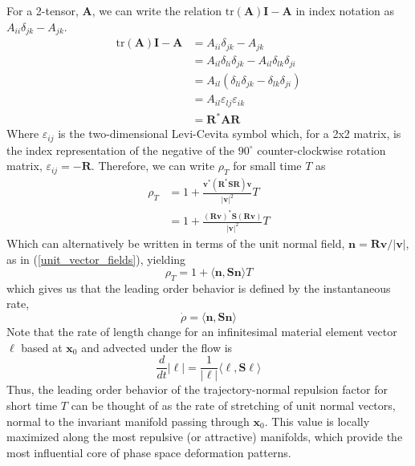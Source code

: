 \documentclass[onecolumn,3p]{elsarticle}
\begin{document}
	For a 2-tensor, \(\mathbf{A}\), we can write the relation \(\text{tr}(\mathbf{A})\mathbf{I}-\mathbf{A}\) in index notation as \(A_{ii}\delta_{jk} - A_{jk}\).
	\begin{equation}
	\begin{aligned}
	\text{tr}(\mathbf{A})\mathbf{I}-\mathbf{A} &= A_{ii}\delta_{jk} - A_{jk} \\
	&= A_{il}\delta_{li}\delta_{jk} - A_{il}\delta_{lk}\delta_{ji} \\
	&= A_{il}(\delta_{li}\delta_{jk} - \delta_{lk}\delta_{ji}) \\ 
	&= A_{il}\varepsilon_{lj}\varepsilon_{ik} \\
	&= \mathbf{R}^*\mathbf{A}\mathbf{R}
	\end{aligned}
	\end{equation}
	Where \(\varepsilon_{ij}\) is the two-dimensional Levi-Cevita symbol which, for a 2x2 matrix, is the index representation of the negative of the $90^\circ$ counter-clockwise rotation matrix,  $\varepsilon_{ij} = -\mathbf{R}$. Therefore, we can write \(\rho_T\) for small time $T$ as 
	\begin{equation}
	\begin{aligned}
	\rho_T &= 1+ \frac{\mathbf{v}^*(\mathbf{R}^*\mathbf{S}\mathbf{R})\mathbf{v}}{\left|\mathbf{v}\right|^2}T \\
	& = 1+ \frac{(\mathbf{R}\mathbf{v})^*\mathbf{S}(\mathbf{R}\mathbf{v})}{\left|\mathbf{v}\right|^2}T 
	\end{aligned}
	\end{equation}
	Which can  alternatively be written in terms of the unit normal field, \(\mathbf{n} = \mathbf{R}\mathbf{v}/\left|\mathbf{v}\right|\), as in (\ref{unit_vector_fields}), yielding
	\begin{equation}
	\rho_T 
	= 1+ \langle \mathbf{n},\mathbf{S}\mathbf{n} \rangle T 
	\end{equation}	
	which gives us that the leading order behavior is defined by the instantaneous rate,
	\begin{equation}	
	\dot \rho = \langle \mathbf{n},\mathbf{S}\mathbf{n} \rangle
	\end{equation}
	Note that the rate of length change for an infinitesimal material element vector $\ell$ based at $\mathbf{x}_0$ and advected under the flow is
	\begin{equation}
	\frac{d}{dt} |\ell| = \frac{1}{| \ell |} \langle \ell,\mathbf{S}\ell \rangle
	\end{equation}	
	Thus, the leading order behavior of the trajectory-normal repulsion factor for short time \(T\) can be thought of as the rate  of stretching of unit normal vectors, normal to the invariant manifold passing through $\mathbf{x}_0$.
	This value is locally maximized along the most repulsive (or attractive) manifolds, which provide the most influential core of phase space deformation patterns.
	
\end{document}
